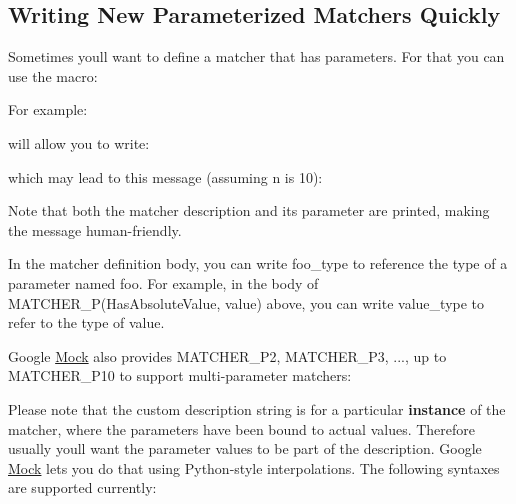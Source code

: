 \subsection*{Writing New Parameterized Matchers Quickly}

Sometimes you\textquotesingle{}ll want to define a matcher that has parameters. For that you can use the macro\+: 
\begin{DoxyCode}{0}
\end{DoxyCode}


For example\+: 
\begin{DoxyCode}{0}
\end{DoxyCode}
 will allow you to write\+: 
\begin{DoxyCode}{0}
\end{DoxyCode}
 which may lead to this message (assuming {\ttfamily n} is 10)\+: 
\begin{DoxyCode}{0}
\end{DoxyCode}


Note that both the matcher description and its parameter are printed, making the message human-\/friendly.

In the matcher definition body, you can write {\ttfamily foo\+\_\+type} to reference the type of a parameter named {\ttfamily foo}. For example, in the body of {\ttfamily M\+A\+T\+C\+H\+E\+R\+\_\+\+P(\+Has\+Absolute\+Value, value)} above, you can write {\ttfamily value\+\_\+type} to refer to the type of {\ttfamily value}.

Google \mbox{\hyperlink{class_mock}{Mock}} also provides {\ttfamily M\+A\+T\+C\+H\+E\+R\+\_\+\+P2}, {\ttfamily M\+A\+T\+C\+H\+E\+R\+\_\+\+P3}, ..., up to {\ttfamily M\+A\+T\+C\+H\+E\+R\+\_\+\+P10} to support multi-\/parameter matchers\+: 
\begin{DoxyCode}{0}
\end{DoxyCode}


Please note that the custom description string is for a particular {\bfseries{instance}} of the matcher, where the parameters have been bound to actual values. Therefore usually you\textquotesingle{}ll want the parameter values to be part of the description. Google \mbox{\hyperlink{class_mock}{Mock}} lets you do that using Python-\/style interpolations. The following syntaxes are supported currently\+:

